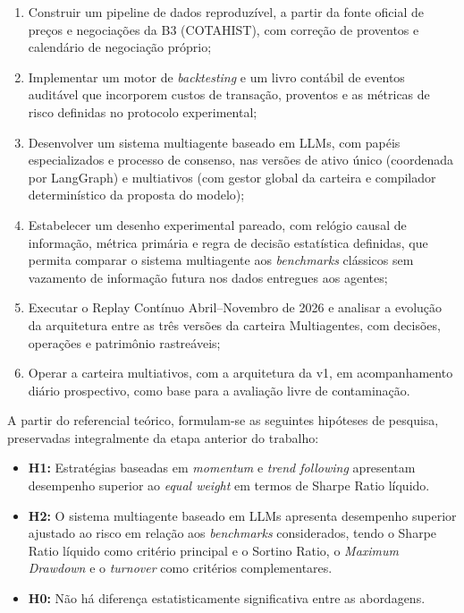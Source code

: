 \begin{enumerate}
    \item Construir um pipeline de dados reproduzível, a partir da fonte oficial de preços e negociações da B3 (COTAHIST), com correção de proventos e calendário de negociação próprio;
    \item Implementar um motor de \textit{backtesting} e um livro contábil de eventos auditável que incorporem custos de transação, proventos e as métricas de risco definidas no protocolo experimental;
    \item Desenvolver um sistema multiagente baseado em LLMs, com papéis especializados e processo de consenso, nas versões de ativo único (coordenada por LangGraph) e multiativos (com gestor global da carteira e compilador determinístico da proposta do modelo);
    \item Estabelecer um desenho experimental pareado, com relógio causal de informação, métrica primária e regra de decisão estatística definidas, que permita comparar o sistema multiagente aos \textit{benchmarks} clássicos sem vazamento de informação futura nos dados entregues aos agentes;
    \item Executar o Replay Contínuo Abril--Novembro de 2026 e analisar a evolução da arquitetura entre as três versões da carteira Multiagentes, com decisões, operações e patrimônio rastreáveis;
    \item Operar a carteira multiativos, com a arquitetura da v1, em acompanhamento diário prospectivo, como base para a avaliação livre de contaminação.
\end{enumerate}

A partir do referencial teórico, formulam-se as seguintes hipóteses de pesquisa, preservadas integralmente da etapa anterior do trabalho:

\begin{itemize}
    \item \textbf{H1:} Estratégias baseadas em \textit{momentum} e \textit{trend following} apresentam desempenho superior ao \textit{equal weight} em termos de Sharpe Ratio líquido.
    \item \textbf{H2:} O sistema multiagente baseado em LLMs apresenta desempenho superior ajustado ao risco em relação aos \textit{benchmarks} considerados, tendo o Sharpe Ratio líquido como critério principal e o Sortino Ratio, o \textit{Maximum Drawdown} e o \textit{turnover} como critérios complementares.
    \item \textbf{H0:} Não há diferença estatisticamente significativa entre as abordagens.
\end{itemize}

